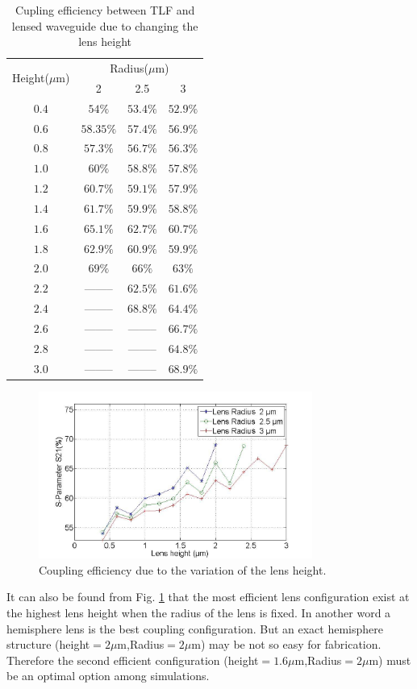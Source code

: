 \begin{table}
\caption{Cupling efficiency between TLF and lensed waveguide due to changing the lens height}
\centering
\begin{tabular}{|c|c|c|c|}
\hline
\multirow{2}{*}{Height($\mu$m)}&\multicolumn{3}{c|}{Radius($\mu$m)}\\
\cline{2-4}
 			&	2&	2.5&	3\\
\hline
$0.4$&$54\%$&$53.4\%$&$52.9\%$\\
$0.6$&$58.35\%$&$57.4\%$&$56.9\%$\\
$0.8$&$57.3\%$&$56.7\%$&$56.3\%$\\
$1.0$&$60\%$&$58.8\%$&$57.8\%$\\
$1.2$&$60.7\%$&$59.1\%$&$57.9\%$\\
$1.4$&$61.7\%$&$59.9\%$&$58.8\%$\\
$1.6$&$65.1\%$&$62.7\%$&$60.7\%$\\
$1.8$&$62.9\%$&$60.9\%$&$59.9\%$\\
$2.0$&$69\%$  &  $66\%$&$63\%$\\
$2.2$&--------&$62.5\%$&$61.6\%$\\
$2.4$&--------&$68.8\%$&$64.4\%$\\
$2.6$&--------&--------&$66.7\%$\\
$2.8$&--------&--------&$64.8\%$\\
$3.0$&--------&--------&$68.9\%$\\
\hline
\end{tabular}
\label{tab:coupling_lensed_waveguide_height}
\end{table}
\begin{figure}[!ht]
\centering
\includegraphics[width=0.8\textwidth]{bilder/s21_fix_lens_radium_hxx}
\caption{Coupling efficiency due to the variation of the lens height.}
\label{fig:coupling_lenses_curve_hxx}
\end{figure}
It can also be found from Fig. \ref{fig:coupling_lenses_curve_hxx} that the most efficient lens configuration exist at the highest lens height when the radius of the lens is fixed. In another word a hemisphere lens is the best coupling configuration. But an exact hemisphere structure (height$=2\mu$m,Radius$=2\mu$m) may be not so easy for fabrication. Therefore the second efficient configuration (height$=1.6\mu$m,Radius$=2\mu$m) must be  an optimal option among simulations.\\ 

